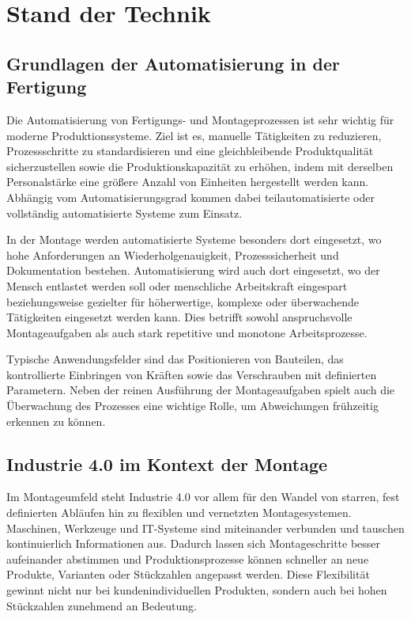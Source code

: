 \section{Stand der Technik}

\subsection{Grundlagen der Automatisierung in der Fertigung}
Die Automatisierung von Fertigungs- und Montageprozessen ist sehr wichtig für moderne Produktionssysteme. Ziel ist es, manuelle Tätigkeiten zu reduzieren, Prozessschritte zu standardisieren und eine gleichbleibende Produktqualität sicherzustellen sowie die Produktionskapazität zu erhöhen, indem mit derselben Personalstärke eine größere Anzahl von Einheiten hergestellt werden kann. Abhängig vom Automatisierungsgrad kommen dabei teilautomatisierte oder vollständig automatisierte Systeme zum Einsatz.

In der Montage werden automatisierte Systeme besonders dort eingesetzt, wo hohe Anforderungen an Wiederholgenauigkeit, Prozesssicherheit und Dokumentation bestehen. Automatisierung wird auch dort eingesetzt, wo der Mensch entlastet werden soll oder menschliche Arbeitskraft eingespart beziehungsweise gezielter für höherwertige, komplexe oder überwachende Tätigkeiten eingesetzt werden kann. Dies betrifft sowohl anspruchsvolle Montageaufgaben als auch stark repetitive und monotone Arbeitsprozesse.

Typische Anwendungsfelder sind das Positionieren von Bauteilen, das kontrollierte Einbringen von Kräften sowie das Verschrauben mit definierten Parametern. Neben der reinen Ausführung der Montageaufgaben spielt auch die Überwachung des Prozesses eine wichtige Rolle, um Abweichungen frühzeitig erkennen zu können.\cite{Groover_Automation,Lotter_Montage}

\subsection{Industrie 4.0 im Kontext der Montage}
Im Montageumfeld steht Industrie 4.0 vor allem für den Wandel von starren, fest definierten Abläufen hin zu flexiblen und vernetzten Montagesystemen. Maschinen, Werkzeuge und IT-Systeme sind miteinander verbunden und tauschen kontinuierlich Informationen aus. Dadurch lassen sich Montageschritte besser aufeinander abstimmen und Produktionsprozesse können schneller an neue Produkte, Varianten oder Stückzahlen angepasst werden. Diese Flexibilität gewinnt nicht nur bei kundenindividuellen Produkten, sondern auch bei hohen Stückzahlen zunehmend an Bedeutung.\cite{Kagermann_I40}

